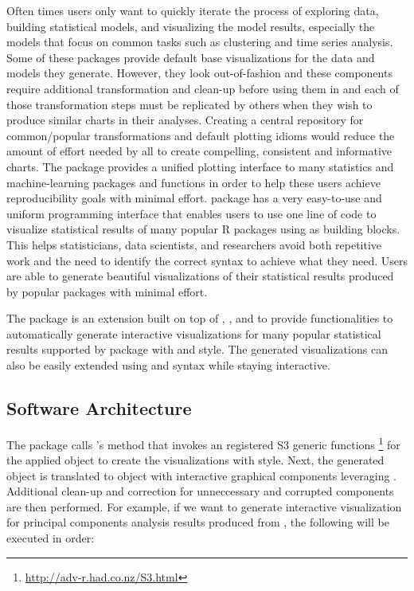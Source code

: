 Often times users only want to quickly iterate the process of exploring
data, building statistical models, and visualizing the model results,
especially the models that focus on common tasks such as clustering and
time series analysis. Some of these packages provide default base
 visualizations for the data and models they generate.
However, they look out-of-fashion and these components require
additional transformation and clean-up before using them in
 and each of those transformation steps must be replicated
by others when they wish to produce similar charts in their analyses.
Creating a central repository for common/popular transformations and
default plotting idioms would reduce the amount of effort needed by all
to create compelling, consistent and informative charts. The
 \citep{rjggfortify} package provides a unified
 plotting interface to many statistics and machine-learning
packages and functions in order to help these users achieve
reproducibility goals with minimal effort.  package has a
very easy-to-use and uniform programming interface that enables users to
use one line of code to visualize statistical results of many popular R
packages using  as building blocks. This helps
statisticians, data scientists, and researchers avoid both repetitive
work and the need to identify the correct  syntax to
achieve what they need. Users are able to generate beautiful
visualizations of their statistical results produced by popular packages
with minimal effort.

The  \citep{autoplotly} package is an extension
built on top of , , and  to
provide functionalities to automatically generate interactive
visualizations for many popular statistical results supported by
 package with  and  style. The
generated visualizations can also be easily extended using 
and  syntax while staying interactive.

\subsection{Software Architecture}\label{software-architecture}

The  package calls 's 
method that invokes an registered S3 generic functions
\footnote{\url{http://adv-r.had.co.nz/S3.html}} for the applied object
to create the visualizations with  style. Next, the
generated  object is translated to  object
with interactive graphical components leveraging
. Additional clean-up and correction for
unneccessary and corrupted components are then performed. For example,
if we want to generate interactive visualization for principal
components analysis results produced from , the
following will be executed in order:

